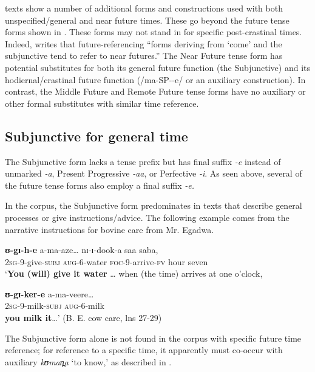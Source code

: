 \documentclass[output=paper]{langsci/langscibook}
\begin{document}
 texts show a number of additional forms and constructions used with both unspecified/general and near future times. These go beyond the future tense forms shown in . These forms may not stand in for specific post-crastinal times. Indeed, \citet[85]{Nurse2008} writes that  future-referencing “forms deriving from ‘come’ and the subjunctive tend to refer to near futures.” The  Near Future tense form has potential substitutes for both its general future function (the Subjunctive) and its hodiernal/crastinal future function (/ma-SP-{\longrule}-e/ or an auxiliary construction). In contrast, the Middle Future and Remote Future tense forms have no auxiliary or other formal substitutes with similar time reference.

\subsection{Subjunctive for general time} \label{sec:sarvasy:7.1}

The Subjunctive form lacks a tense prefix but has final suffix \textit{-e} instead of unmarked \textit{-a}, Present Progressive \textit{-aa}, or Perfective \textit{-i}. As seen above, several of the future tense forms also employ a final suffix \textit{-e.} 

In the corpus, the Subjunctive form predominates in texts that describe general processes or give instructions/advice. The following example comes from the narrative instructions for bovine care from {Mr. Egadwa}. 

\ea\label{ex:sarvasy:18}
\gll \textbf{ʊ-gɪ-h-e}     a-ma-aze…   nɪ-ɪ-dook-a   saa   saba, \\  
\textsc{\textup{2sg}}\textsc{-}9-give-\textsc{subj}  \textsc{aug}-6-water  \textsc{foc}-9-arrive-\textsc{fv}  hour  seven \\
\glt ‘\textbf{You (will) give it water} … when (the time) arrives at one o’clock,

\gll \textbf{ʊ-gɪ-ker-e}   a-ma-veere\ldots \\
\textsc{2sg}-9-milk-\textsc{subj}  \textsc{aug}-6-milk \\
\glt \textbf{you milk it}…’ (B. E. cow care, lns 27-29)
\z

The Subjunctive form alone is not found in the corpus with specific future time reference; for reference to a specific time, it apparently must co-occur with auxiliary \textit{kʊman̪a} ‘to know,’ as described in . 
\end{document}
